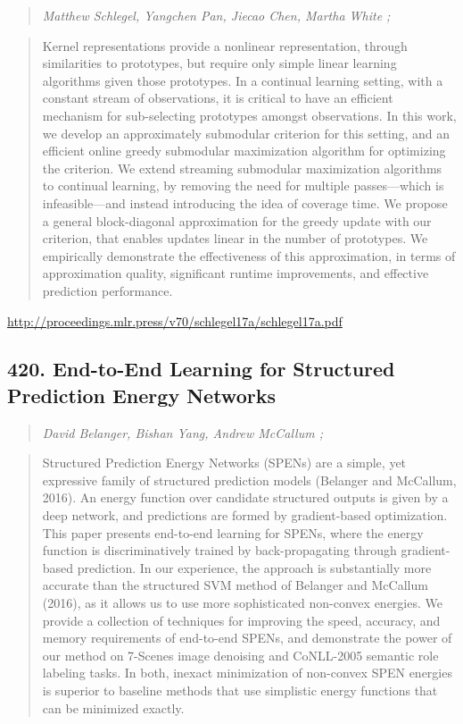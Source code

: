 \documentclass{article}
\begin{document}
\begin{quote}
\footnotesize{\textit{Matthew Schlegel, Yangchen Pan, Jiecao Chen, Martha White ;}}
\end{quote}

\begin{quote}
    Kernel representations provide a nonlinear representation, through similarities to prototypes, but require only simple linear learning algorithms given those prototypes. In a continual learning setting, with a constant stream of observations, it is critical to have an efficient mechanism for sub-selecting prototypes amongst observations. In this work, we develop an approximately submodular criterion for this setting, and an efficient online greedy submodular maximization algorithm for optimizing the criterion. We extend streaming submodular maximization algorithms to continual learning, by removing the need for multiple passes—which is infeasible—and instead introducing the idea of coverage time. We propose a general block-diagonal approximation for the greedy update with our criterion, that enables updates linear in the number of prototypes. We empirically demonstrate the effectiveness of this approximation, in terms of approximation quality, significant runtime improvements, and effective prediction performance.  \end{quote}

\href{http://proceedings.mlr.press/v70/schlegel17a/schlegel17a.pdf}{http://proceedings.mlr.press/v70/schlegel17a/schlegel17a.pdf}

\subsection{420. End-to-End Learning for Structured Prediction Energy Networks}

\begin{quote}
\footnotesize{\textit{David Belanger, Bishan Yang, Andrew McCallum ;}}
\end{quote}

\begin{quote}
    Structured Prediction Energy Networks (SPENs) are a simple, yet expressive family of structured prediction models (Belanger and McCallum, 2016). An energy function over candidate structured outputs is given by a deep network, and predictions are formed by gradient-based optimization. This paper presents end-to-end learning for SPENs, where the energy function is discriminatively trained by back-propagating through gradient-based prediction. In our experience, the approach is substantially more accurate than the structured SVM method of Belanger and McCallum (2016), as it allows us to use more sophisticated non-convex energies. We provide a collection of techniques for improving the speed, accuracy, and memory requirements of end-to-end SPENs, and demonstrate the power of our method on 7-Scenes image denoising and CoNLL-2005 semantic role labeling tasks. In both, inexact minimization of non-convex SPEN energies is superior to baseline methods that use simplistic energy functions that can be minimized exactly.  \end{quote}
\end{document}
